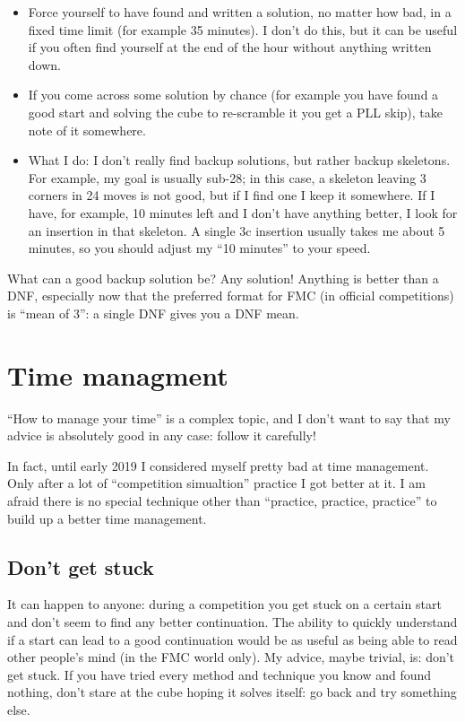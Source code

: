 \documentclass[11pt,a4paper]{book}
\begin{document}
\begin{itemize}
\item Force yourself to have found and written a solution, no matter how bad, in a fixed time limit (for example 35 minutes). I don't do this, but it can be useful if you often find yourself at the end of the hour without anything written down.
\item If you come across some solution by chance (for example you have found a good start and solving the cube to re-scramble it you get a PLL skip), take note of it somewhere.
\item What I do: I don't really find backup solutions, but rather backup skeletons. For example, my goal is usually sub-28; in this case, a skeleton leaving 3 corners in 24 moves is not good, but if I find one I keep it somewhere. If I have, for example, 10 minutes left and I don't have anything better, I look for an insertion in that skeleton. A single 3c insertion usually takes me about 5 minutes, so you should adjust my ``10 minutes'' to your speed.
\end{itemize}

What can a good backup solution be? Any solution! Anything is better than a DNF, especially now that the preferred format for FMC (in official competitions) is  ``mean of 3'': a single DNF gives you a DNF mean.

\section{Time managment}
\label{time-ma}

``How to manage your time'' is a complex topic, and I don't want to say that my advice is absolutely good in any case: follow it carefully!

In fact, until early 2019 I considered myself pretty bad at time management. Only after a lot of ``competition simualtion'' practice I got better at it. I am afraid there is no special technique other than ``practice, practice, practice'' to build up a better time management.

\subsection{Don't get stuck}

It can happen to anyone: during a competition you get stuck on a certain start and don't seem to find any better continuation. The ability to quickly understand if a start can lead to a good continuation would be as useful as being able to read other people's mind (in the FMC world only). My advice, maybe trivial, is: don't get stuck. If you have tried every method and technique you know and found nothing, don't stare at the cube hoping it solves itself: go back and try something else.
\end{document}
